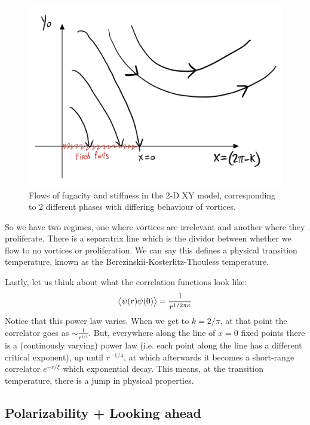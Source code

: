 \begin{figure}[htbp]
    \centering
    \includegraphics[scale=0.3]{Lectures/Figures/xymodelflow.png}
    \caption{Flows of fugacity and stiffness in the 2-D XY model, corresponding to 2 different phases with differing behaviour of vortices.}
    \label{fig:xymodelflow}
\end{figure}

So we have two regimes, one where vortices are irrelevant and another where they proliferate. There is a separatrix line which is the dividor between whether we flow to no vortices or proliferation. We can say this defines a physical transition temperature, known as the Berezinskii-Kosterlitz-Thouless temperature.

Lastly, let us think about what the correlation functions look like:
\begin{equation}
    \left< \psi(r)\psi(0) \right> = \frac{1}{r^{1/2\pi\kappa}}
\end{equation}
Notice that this power law varies. When we get to $k = 2/\pi$, at that point the correlator goes as $\sim \frac{1}{r^{1/4}}$. But, everywhere along the line of $x = 0$ fixed points there is a (continously varying) power law (i.e. each point along the line has a different critical exponent), up until $r^{-1/4}$, at which afterwards it becomes a short-range correlator $e^{-r/\xi}$ which exponential decay. This means, at the transition temperature, there is a jump in physical properties.

\subsection{Polarizability + Looking ahead}

